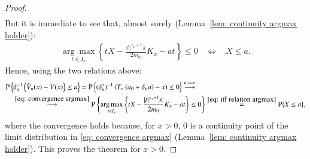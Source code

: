 \begin{proof}
\begin{align}
\end{align}
But it is immediate to see that, almost surely (Lemma~\ref{lem: continuity argmax holder}):
\begin{align}\label{eq: iff relation argmax}
    \underset{t \in I_x}{\arg \max }\left\{t X-\frac{|t|^{\gamma_x+ 1} \pi}{2 m_0} K_x  -a t \right\} \leq 0 \: \: \: \: \iff \: \: \: \: X \leq a.
\end{align}
Hence, using the two relations above:
\begin{align*}
&\mathrm{P}\left\{\delta_n^{-1}\left(\hat{V}_n(x)-V(x)\right) \leq a\right\}=\mathrm{P}\left\{(\delta^*_n)^{-1}\left(T_n\left(a_0+\delta_n a\right)-x\right) \leq 0\right\} \stackrel{n \rightarrow \infty}{\longrightarrow} \\
& \quad \stackrel{\eqref{eq: convergence argmax}}{\longrightarrow} \mathrm{P} \left\{ \underset{t \in I_x}{\arg \max }\left\{t X-\frac{|t|^{\gamma_x+ 1} \pi}{2 m_0} K_x  -a t \right\} \leq 0 \right\} \stackrel{\eqref{eq: iff relation argmax} }{=} \mathrm{P}\{ X \leq a\},
\end{align*}
where the convergence holds because, for $x>0$, $0$ is a continuity point of the limit distribution in \eqref{eq: convergence argmax} (Lemma~\ref{lem: continuity argmax holder}). This proves the theorem for $x>0$.


\end{proof}
